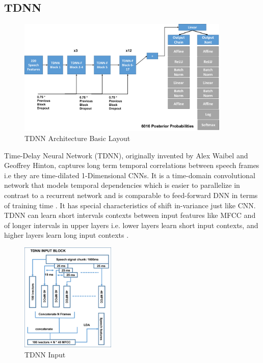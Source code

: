 \subsection{TDNN}

\begin{figure}[htb]
    \centering
    \includegraphics[width=0.9\textwidth]{img/TDNN2.png}
    \caption{TDNN Architecture Basic Layout}
    \label{fig:TDNN-arch}
\end{figure}

Time-Delay Neural Network (TDNN), originally invented by Alex Waibel and Geoffrey Hinton, captures long term temporal correlations between speech frames i.e they are time-dilated 1-Dimensional CNNs. It is a time-domain convolutional network that models temporal dependencies which is easier to parallelize in contrast to a recurrent network and is comparable to feed-forward DNN in terms of training time \cite{noauthor_tdnn_nodate}. It has special characteristics of shift in-variance just like CNN. TDNN can learn short intervals contexts between input features like MFCC and of longer intervals in upper layers i.e. lower layers learn short input contexts, and higher layers learn long input contexts \cite{liu_time_2019}.

\begin{figure}[h!]
    \centering
    \includegraphics[width=0.4\textwidth]{img/TDNN INPUT.png}
    \caption{TDNN Input}   
    \label{fig:TDNN-INPUT}
\end{figure}

